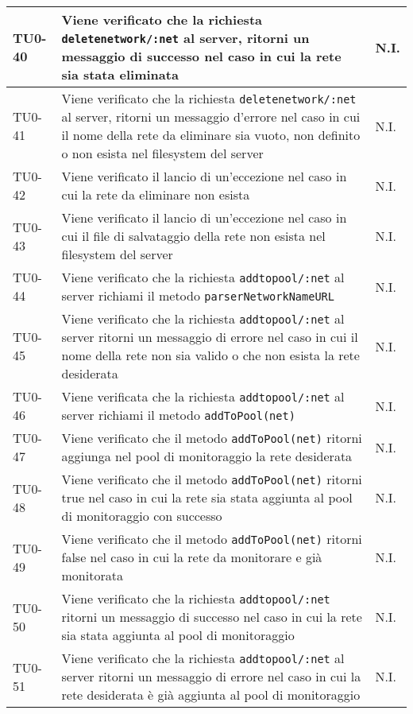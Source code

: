 \begin{longtable}{|C{.15\textwidth}|m{.65\textwidth}|C{.20\textwidth}|}
 \hline 
 TU0-40 & Viene verificato che la richiesta \texttt{deletenetwork/:net} al server, ritorni un messaggio di successo nel caso in cui la rete sia stata eliminata & N.I. \\
 \hline
 TU0-41 & Viene verificato che la richiesta \texttt{deletenetwork/:net} al server, ritorni un messaggio d'errore nel caso in cui il nome della rete da eliminare sia vuoto,  non definito o non esista nel filesystem del server & N.I. \\ 
 \hline
{}TU0-42 & Viene verificato il lancio di un'eccezione nel caso in cui la rete da eliminare non esista & N.I. \\ 
\hline
 TU0-43 & Viene verificato il lancio di un'eccezione nel caso in cui il file di salvataggio della rete non esista nel filesystem del server & N.I. \\ 
 \hline
  TU0-44 & Viene verificato che la richiesta \texttt{addtopool/:net} al server richiami il metodo \texttt{parserNetworkNameURL} & N.I. \\ 
 \hline
 TU0-45 & Viene verificato che la richiesta \texttt{addtopool/:net} al server ritorni un messaggio di errore nel caso in cui il nome della rete non sia valido o che non esista la rete desiderata & N.I. \\ 
 \hline
 TU0-46 & Viene verificata che la richiesta \texttt{addtopool/:net} al server richiami il metodo \texttt{addToPool(net)} & N.I. \\ 
 \hline
 TU0-47 & Viene verificato che il metodo \texttt{addToPool(net)} ritorni aggiunga nel pool di monitoraggio la rete desiderata & N.I. \\
\hline
{} TU0-48 & Viene verificato che il metodo \texttt{addToPool(net)} ritorni true nel caso in cui la rete sia stata aggiunta al pool di monitoraggio con successo & N.I. \\ 
\hline 
TU0-49 & Viene verificato che il metodo \texttt{addToPool(net)} ritorni false nel caso in cui la rete da monitorare e già monitorata & N.I. \\ 
\hline
{} TU0-50 & Viene verificato che la richiesta \texttt{addtopool/:net} ritorni un messaggio di successo nel caso in cui la rete sia stata aggiunta al pool di monitoraggio & N.I. \\ 
\hline 
TU0-51 & Viene verificato che la richiesta \texttt{addtopool/:net} al server ritorni un messaggio di errore nel caso in cui la rete desiderata è già aggiunta al pool di monitoraggio & N.I. \\ 

\end{longtable}
